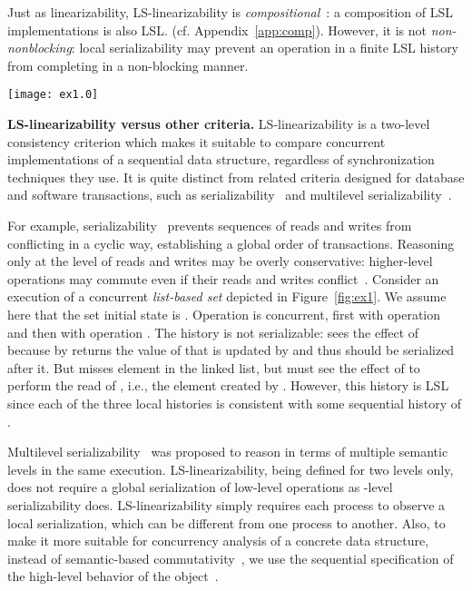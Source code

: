 \documentclass[11pt,pdftex,letterpaper]{article}
\newcommand{\LS}{LS}
\begin{document}
Just as linearizability, \LS-linearizability is
\emph{compositional}~\cite{HW90,HS08-book}: a composition of LSL 
implementations is also LSL. (cf. Appendix~\ref{app:comp}).
However, it is not \emph{non-nonblocking}: local
serializability may prevent an operation in a finite LSL
history from completing in a non-blocking manner. 

\begin{figure*}[t]
 \texttt{[image: ex1.0]}
 \caption{\small{A concurrency scenario for a list-based set, initially , where value  is stored at node :
    and   can proceed
   concurrently with , the history is
   LS-linearizable but not serializable. (We only depict important read-write
   events here.)}}\label{fig:ex1}\end{figure*}

\vspace{1mm}\noindent\textbf{LS-linearizability versus other criteria.}
LS-linearizability is a two-level consistency criterion which makes it
suitable to compare concurrent implementations of a sequential data
structure, regardless of synchronization techniques they use.
It is quite distinct from related criteria designed for database and software
transactions, such as serializability~\cite{Pap79-serial,WV02-book} and
multilevel serializability~\cite{Wei86,WV02-book}.

For example, serializability~\cite{Pap79-serial} prevents sequences of reads and writes from conflicting in a cyclic way, 
establishing a  global order of transactions.
Reasoning only at the level of reads and writes may be overly conservative:
higher-level operations may commute even if their reads and writes conflict~\cite{Wei88}.
Consider an execution of a concurrent \emph{list-based set} depicted in 
Figure~\ref{fig:ex1}.
We assume here that the set initial state is .
Operation  is concurrent, first with 
operation  and then with operation . 
The history is not serializable:
 sees 
the effect of  because  by  returns the value
of  that is updated by  and
thus should be serialized after it. But  misses
element  in the linked list, but must see the
effect of  to perform the read of , i.e., the element created by .  
However, this history is LSL since each of the three local histories is consistent with some
sequential history of . 

Multilevel serializability~\cite{Wei86,WV02-book} was 
proposed to reason in terms of multiple semantic levels in the same execution.
\LS-linearizability, being defined for two levels only, does not require a global serialization of low-level operations as
-level serializability does. 
LS-linearizability simply requires each process  to observe a local serialization, which can be different from one
process to another. Also, to make it more suitable for concurrency
analysis of a concrete data structure, instead of semantic-based commutativity~\cite{Wei88}, we use the sequential
specification of the high-level behavior of the object~\cite{HW90}.
\end{document}
